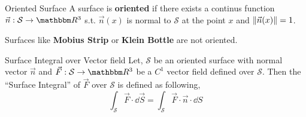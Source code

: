 \documentclass[../Analysis-3]{subfiles}
\begin{document}
\begin{Def}{Oriented Surface}{}
    A surface is \textbf{oriented} if there exists a continus function $\vec{n} : \mathcal{S} \to \R^3$ s.t. $\vec{n}(x)$ is normal to $\mathcal{S}$ at the point $x$ and $\norm{\vec{n}(x)} = 1$.
\end{Def}


Surfaces like \textbf{Mobius Strip} or \textbf{Klein Bottle} are not oriented.

\begin{Def}{Surface Integral over Vector field}{}
    Let, $\mathcal{S}$ be an oriented surface with normal vector $\vec{n}$ and $\vec{F} : \mathcal{S} \to \R^3$ be a $C^1$ vector field defined over $\mathcal{S}$. Then the  ``Surface Integral'' of $\vec{F}$ over $\mathcal{S}$ is defined as following,
     \[ \int_{\mathcal{S}} \vec{F} \cdot \dd \vec{S} = \int_{\mathcal{S}} \vec{F}\cdot\vec{n} \cdot \dd S \]
\end{Def}


\end{document}
